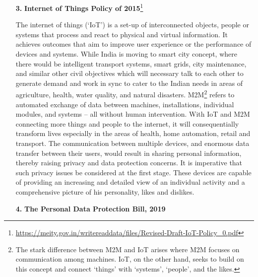 \begin{multicols}{2}
\begin{itemize}
\item[{\bf 3.}] \textbf{Internet of Things Policy of 2015}\footnote{\url{https://meity.gov.in/writereaddata/files/Revised-Draft-IoT-Policy\_0.pdf}}

\vskip 0.18cm

The internet of things (‘IoT’) is a set-up of interconnected objects, people or systems that process and react to physical and virtual information. It achieves outcomes that aim to improve user experience or the performance of devices and systems. While India is moving to smart city concept, where there would be intelligent transport systems, smart grids, city maintenance, and similar other civil objectives which will necessary talk to each other to generate demand and work in sync to cater to the Indian needs in areas of agriculture, health, water quality, and natural disasters. M2M\footnote{The stark difference between M2M and IoT arises where M2M focuses on communication among machines. IoT, on the other hand, seeks to build on this concept and connect ‘things’ with ‘systems’, ‘people’, and the likes.} refers to automated exchange of data between machines, installations, individual modules, and systems – all without human intervention. With IoT and M2M connecting more things and people to the internet, it will consequentially transform lives especially in the areas of health, home automation, retail and transport. The communication between multiple devices, and enormous data transfer between their users, would result in sharing personal information, thereby raising privacy and data protection concerns. It is imperative that such privacy issues be considered at the first stage. These devices are capable of providing an increasing and detailed view of an individual activity and a comprehensive picture of his personality, likes and dislikes.

\item[{\bf 4.}] \textbf{The Personal Data Protection Bill, 2019}

\vskip 0.18cm


\end{itemize}
\end{multicols}
